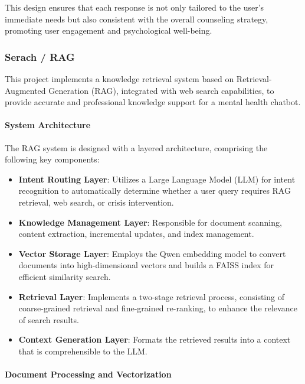 This design ensures that each response is not only tailored to the user's immediate needs but also consistent with the overall counseling strategy, promoting user engagement and psychological well-being.

\subsubsection{Serach / RAG}

This project implements a knowledge retrieval system based on Retrieval-Augmented Generation (RAG), integrated with web search capabilities, to provide accurate and professional knowledge support for a mental health chatbot.

\paragraph{System Architecture}

The RAG system is designed with a layered architecture, comprising the following key components:

\begin{itemize} \item \textbf{Intent Routing Layer}: Utilizes a Large Language Model (LLM) for intent recognition to automatically determine whether a user query requires RAG retrieval, web search, or crisis intervention. \item \textbf{Knowledge Management Layer}: Responsible for document scanning, content extraction, incremental updates, and index management. \item \textbf{Vector Storage Layer}: Employs the Qwen embedding model to convert documents into high-dimensional vectors and builds a FAISS index for efficient similarity search. \item \textbf{Retrieval Layer}: Implements a two-stage retrieval process, consisting of coarse-grained retrieval and fine-grained re-ranking, to enhance the relevance of search results. \item \textbf{Context Generation Layer}: Formats the retrieved results into a context that is comprehensible to the LLM. \end{itemize}

\paragraph{Document Processing and Vectorization}

